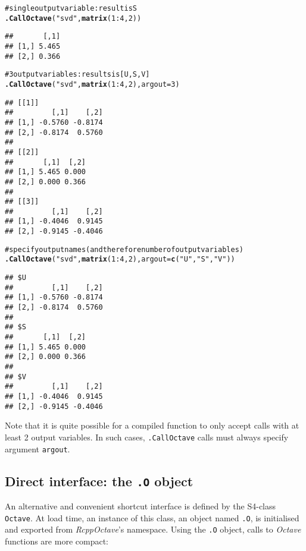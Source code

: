 \documentclass[english,10pt,a4paper]{article}\usepackage{graphicx, color}
\makeatletter
\newcommand{\hlfunctioncall}[1]{\textcolor[rgb]{0.501960784313725,0,0.329411764705882}{\textbf{#1}}}%
\newcommand{\hlstring}[1]{\textcolor[rgb]{0.6,0.6,1}{#1}}%
\newcommand{\hlcomment}[1]{\textcolor[rgb]{0.180392156862745,0.6,0.341176470588235}{#1}}%
\newenvironment{kframe}{%
 \def\at@end@of@kframe{}%
 \ifinner\ifhmode%
  \def\at@end@of@kframe{\end{minipage}}%
  \begin{minipage}{\columnwidth}%
 \fi\fi%
 \def\FrameCommand##1{\hskip\@totalleftmargin \hskip-\fboxsep
 \colorbox{shadecolor}{##1}\hskip-\fboxsep
     \hskip-\linewidth \hskip-\@totalleftmargin \hskip\columnwidth}%
 \MakeFramed {\advance\hsize-\width
   \@totalleftmargin\z@ \linewidth\hsize
   \@setminipage}}%
 {\par\unskip\endMakeFramed%
 \at@end@of@kframe}
\newenvironment{knitrout}{}{} %
\let\proglang=\textit
\let\code=\texttt
\newcommand{\pkgname}[1]{\textit{#1}\xspace}
\newcommand{\octave}{\proglang{Octave}\xspace}
\makeatother
\begin{document}
\begin{knitrout}
\color{fgcolor}\begin{kframe}
\begin{alltt}
\hlcomment{# single output variable: result is S}
\hlfunctioncall{.CallOctave}(\hlstring{"svd"}, \hlfunctioncall{matrix}(1:4, 2))
\end{alltt}
\begin{verbatim}
##       [,1]
## [1,] 5.465
## [2,] 0.366
\end{verbatim}
\begin{alltt}
\hlcomment{# 3 output variables: results is [U,S,V]}
\hlfunctioncall{.CallOctave}(\hlstring{"svd"}, \hlfunctioncall{matrix}(1:4, 2), argout = 3)
\end{alltt}
\begin{verbatim}
## [[1]]
##         [,1]    [,2]
## [1,] -0.5760 -0.8174
## [2,] -0.8174  0.5760
## 
## [[2]]
##       [,1]  [,2]
## [1,] 5.465 0.000
## [2,] 0.000 0.366
## 
## [[3]]
##         [,1]    [,2]
## [1,] -0.4046  0.9145
## [2,] -0.9145 -0.4046
\end{verbatim}
\begin{alltt}
\hlcomment{# specify output names (and therefore number of output variables)}
\hlfunctioncall{.CallOctave}(\hlstring{"svd"}, \hlfunctioncall{matrix}(1:4, 2), argout = \hlfunctioncall{c}(\hlstring{"U"}, \hlstring{"S"}, \hlstring{"V"}))
\end{alltt}
\begin{verbatim}
## $U
##         [,1]    [,2]
## [1,] -0.5760 -0.8174
## [2,] -0.8174  0.5760
## 
## $S
##       [,1]  [,2]
## [1,] 5.465 0.000
## [2,] 0.000 0.366
## 
## $V
##         [,1]    [,2]
## [1,] -0.4046  0.9145
## [2,] -0.9145 -0.4046
\end{verbatim}
\end{kframe}
\end{knitrout}


Note that it is quite possible for a compiled function to only accept
calls with at least 2 output variables.
In such cases, \code{.CallOctave} calls must always specify argument
\code{argout}.

\subsection{Direct interface: the \texttt{.O} object}

An alternative and convenient shortcut interface is defined by the S4-class
\code{Octave}.
At load time, an instance of this class, an object named \code{.O}, is
initialised and exported from \pkgname{RcppOctave}'s namespace.
Using the \code{.O} object, calls to \octave functions are more compact: 
\end{document}
